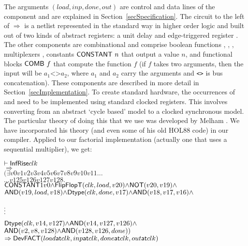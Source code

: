 \documentclass{llncs}
\begin{document}
The arguments $(load,inp,done,out)$ are control and data lines of the
component and are explained in Section~\ref{secSpecification}. The
circuit to the left of $\Rightarrow$ is a netlist represented in the
standard way in higher order logic \cite{Mel93} and built out of two
kinds of abstract registers: a unit delay  and edge-triggered
register . The other components are combinational and
comprise boolean functions ,
, , multiplexers , constants $\mathsf{CONSTANT}~n$ that output a value $n$,
and functional blocks
$\mathsf{COMB}~f$ that compute the function $f$ (if $f$ takes two arguments,
then the input will be $a_1\texttt{<>}a_2$, where $a_1$ and $a_2$ carry the arguments
and \texttt{<>} is bus concatenation). These components are
described in more detail in Section~\ref{secImplementation}. To
create standard hardware, the occurrences of
 and  need to be implemented using standard
clocked registers. This involves converting from an abstract `cycle
based' model to a clocked synchronous model. The particular theory of
doing this that we use was developed by Melham \cite{Mel93}. We have
incorporated his theory (and even some of his old HOL88 code) in
our compiler. Applied to our factorial implementation (actually one that uses a sequential multiplier),
we get:


{\baselineskip10pt\begin{alltt}
\( \vdash \DEF{InfRise} clk                                                                        \)
\(   \Rightarrow                                                                                   \)
\(   ({\exists}v0 v1 v2 v3 v4 v5 v6 v7 v8 v9 v10 v11 ...                               \)
\(     ... v125 v126 v127 v128.                                                                   \)
\(     \DEF{CONSTANT} 1 v0 {\wedge} \DEF{FlipFlopT}(clk,load,v20) {\wedge} \DEF{NOT}(v20,v19) {\wedge}        \)
\(     \DEF{AND}(v19,load,v18) {\wedge} \DEF{Dtype}(clk,done,v17) {\wedge} \DEF{AND}(v18,v17,v16) {\wedge} \)

       \(\raisebox{3mm}{\vdots}\)
\(     \DEF{Dtype}(clk,v14,v127) {\wedge} \DEF{AND}(v14,v127,v126) {\wedge}  \)
\(     \DEF{AND} (v2,v8,v128) {\wedge} \DEF{AND}(v128,v126,done))               \)
\(   \Rightarrow \DEF{Dev} \DEF{FACT} (load \DEF{at} clk, inp \DEF{at} clk, done \DEF{at} clk, out \DEF{at} clk) \)
\end{alltt}}
\end{document}
